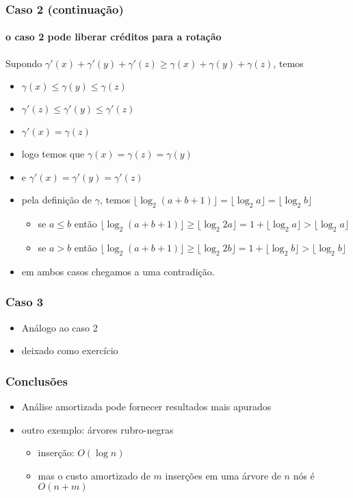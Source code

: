 \documentclass{beamer}
\begin{document}
\begin{frame}

\frametitle{Caso 2 (continuação)}
\framesubtitle{o caso 2 pode liberar créditos para a rotação}

Supondo
$\gamma'(x) + \gamma'(y) + \gamma'(z) \ge \gamma(x) + \gamma(y) + \gamma(z)$,
temos
\begin{itemize}
\item $\gamma(x) \le \gamma(y) \le \gamma(z)$
\item $\gamma'(z) \le \gamma'(y) \le \gamma'(z)$
\item $\gamma'(x) = \gamma(z)$
\item logo temos que $\gamma(x) = \gamma(z) = \gamma(y)$
\item e $\gamma'(x) = \gamma'(y) = \gamma'(z)$
\item pela definição de $\gamma$, temos
$\lfloor \log_2 (a + b + 1) \rfloor = \lfloor \log_2 a \rfloor = \lfloor \log_2 b \rfloor$
\begin{itemize}
\item se $a \le b$ então $\lfloor \log_2 (a+b+1) \rfloor \ge \lfloor \log_2 2a \rfloor = 1 + \lfloor \log_2 a \rfloor > \lfloor \log_2 a \rfloor$
\item se $a > b$ então $\lfloor \log_2 (a+b+1) \rfloor \ge \lfloor \log_2 2b \rfloor = 1 + \lfloor \log_2 b \rfloor > \lfloor \log_2 b \rfloor$
\end{itemize}
\item em ambos casos chegamos a uma contradição.
\end{itemize}
\end{frame}

\begin{frame}

\frametitle{Caso 3}

\begin{itemize}
\item Análogo ao caso 2
\item deixado como exercício
\end{itemize}

\end{frame}

\begin{frame}

\frametitle{Conclusões}

\begin{itemize}
\item Análise amortizada pode fornecer resultados mais apurados
\item outro exemplo: árvores rubro-negras
\begin{itemize}
\item inserção: $O(\log n)$
\item mas o custo amortizado de $m$ inserções em uma árvore de $n$ nós
  é $O(n+m)$
\end{itemize}
\end{itemize}

\end{frame}
\end{document}

